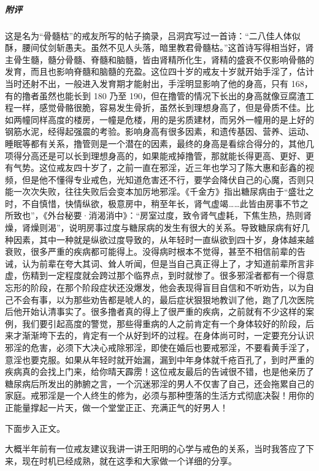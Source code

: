 \begin{case}
    \subparagraph{附评} 这是名为“骨髓枯”的戒友所写的帖子摘录，吕洞宾写过一首诗：“二八佳人体似酥，腰间仗剑斩愚夫。虽然不见人头落，暗里教君骨髓枯。”这首诗写得相当好，肾主骨生髓，髓分骨髓、脊髓和脑髓，皆由肾精所化生，肾精的盛衰不仅影响骨骼的发育，而且也影响脊髓和脑髓的充盈。这位四十岁的戒友十岁就开始手淫了，估计当时还射不出，一般进入发育期才能射出，手淫明显影响了他的身高，只有 168，有的撸者虽然也能长到 180 乃至 190，但在撸管的情况下长出的身高就像豆腐渣工程一样，感觉骨骼很脆，容易发生骨折，虽然长到理想身高了，但是骨质不佳。比如两幢同样高度的楼房，一幢是危楼，用的是劣质建材，而另外一幢用的是上好的钢筋水泥，经得起强震的考验。影响身高有很多因素，和遗传基因、营养、运动、睡眠等都有关系，撸管则是一个潜在的因素，最终的身高是看综合得分的，其他几项得分高还是可以长到理想身高的，如果能戒掉撸管，那就能长得更高、更好、更有气势。这位戒友四十岁了，之前一直在邪淫，近三年也学习了陈大惠和彭鑫的视频，但是他不懂得专业戒色，光知道危害还不行，要学会降伏自己的心魔，否则只能一次次失败，往往失败后会变本加厉地邪淫。《千金方》指出糖尿病由于“盛壮之时，不自慎惜，快情纵欲，极意房中，稍至年长，肾气虚竭……此皆由房事不节之所致也”，《外台秘要·消渴消中》：“房室过度，致令肾气虚耗，下焦生热，热则肾燥，肾燥则渴”，说明房事过度与糖尿病的发生有很大的关系。导致糖尿病有好几种因素，其中一种就是纵欲过度导致的，从年轻时一直纵欲到四十岁，身体越来越衰败，很多严重的疾病都可能得上。没得病时根本不觉得，甚至不相信前辈的告诫，认为前辈在夸大其词、耸人听闻，但是当自己真正得上了，才知道前辈所言非虚，伤精到一定程度就会跨过那个临界点，到时就惨了。很多邪淫者都有一个得意忘形的阶段，在那个阶段症状还没爆发，他会表现得盲目自信和不听劝告，以为自己不会有事，以为那些劝告都是唬人的，最后症状狠狠地教训了他，跑了几次医院后他开始认清事实了。很多撸者真的得上了很严重的疾病，之前就有不少这样的案例，我们要引起高度的警觉，那些得重病的人之前肯定有一个身体较好的阶段，后来才渐渐垮下去的，肯定有一个从好到坏的过程。在身体尚可时，一定要充分认识邪淫的危害，必须下大决心戒除邪淫，即使在婚后也要戒邪淫，不要看黄手淫了，意淫也要克服。如果从年轻时就开始漏，漏到中年身体就千疮百孔了，到时严重的疾病真的会找上门来，给你晴天霹雳！这位戒友最后的告诫很不错，也是他亲历了糖尿病后所发出的肺腑之言，一个沉迷邪淫的男人不仅害了自己，还会拖累自己的家庭。戒邪淫是一个人终生的修为，必须与那种堕落的生活方式彻底决裂！用你的正能量撑起一片天，做一个堂堂正正、充满正气的好男人！
\end{case}

下面步入正文。

大概半年前有一位戒友建议我讲一讲王阳明的心学与戒色的关系，当时我答应了下来，现在时机已经成熟，就在这季和大家做一个详细的分享。

